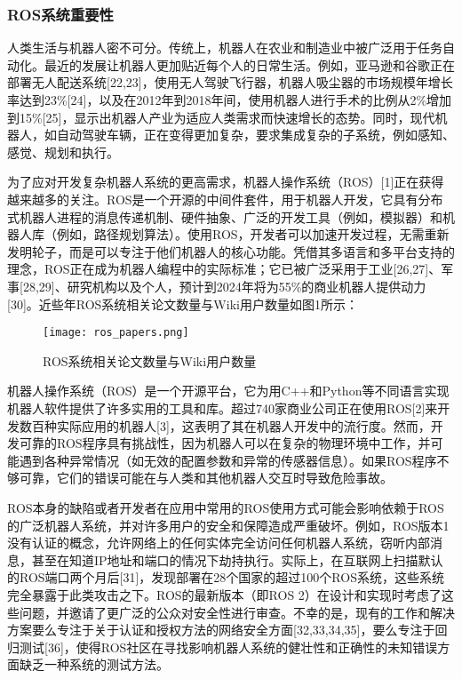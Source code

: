 \subsubsection{ROS系统重要性}
人类生活与机器人密不可分。传统上，机器人在农业和制造业中被广泛用于任务自动化。最近的发展让机器人更加贴近每个人的日常生活。例如，亚马逊和谷歌正在部署无人配送系统[22,23]，使用无人驾驶飞行器，机器人吸尘器的市场规模年增长率达到23\%[24]，以及在2012年到2018年间，使用机器人进行手术的比例从2\%增加到15\%[25]，显示出机器人产业为适应人类需求而快速增长的态势。同时，现代机器人，如自动驾驶车辆，正在变得更加复杂，要求集成复杂的子系统，例如感知、感觉、规划和执行。

为了应对开发复杂机器人系统的更高需求，机器人操作系统（ROS）[1]正在获得越来越多的关注。ROS是一个开源的中间件套件，用于机器人开发，它具有分布式机器人进程的消息传递机制、硬件抽象、广泛的开发工具（例如，模拟器）和机器人库（例如，路径规划算法）。使用ROS，开发者可以加速开发过程，无需重新发明轮子，而是可以专注于他们机器人的核心功能。凭借其多语言和多平台支持的理念，ROS正在成为机器人编程中的实际标准；它已被广泛采用于工业[26,27]、军事[28,29]、研究机构以及个人，预计到2024年将为55\%的商业机器人提供动力[30]。近些年ROS系统相关论文数量与Wiki用户数量如图1所示：

\begin{figure}[H]
  \centering
  \texttt{[image: ros\_papers.png]}
  \caption{ROS系统相关论文数量与Wiki用户数量}
\end{figure}

机器人操作系统（ROS）是一个开源平台，它为用C++和Python等不同语言实现机器人软件提供了许多实用的工具和库。超过740家商业公司正在使用ROS[2]来开发数百种实际应用的机器人[3]，这表明了其在机器人开发中的流行度。然而，开发可靠的ROS程序具有挑战性，因为机器人可以在复杂的物理环境中工作，并可能遇到各种异常情况（如无效的配置参数和异常的传感器信息）。如果ROS程序不够可靠，它们的错误可能在与人类和其他机器人交互时导致危险事故。

ROS本身的缺陷或者开发者在应用中常用的ROS使用方式可能会影响依赖于ROS的广泛机器人系统，并对许多用户的安全和保障造成严重破坏。例如，ROS版本1没有认证的概念，允许网络上的任何实体完全访问任何机器人系统，窃听内部消息，甚至在知道IP地址和端口的情况下劫持执行。实际上，在互联网上扫描默认的ROS端口两个月后[31]，发现部署在28个国家的超过100个ROS系统，这些系统完全暴露于此类攻击之下。ROS的最新版本（即ROS 2）在设计和实现时考虑了这些问题，并邀请了更广泛的公众对安全性进行审查。不幸的是，现有的工作和解决方案要么专注于关于认证和授权方法的网络安全方面[32,33,34,35]，要么专注于回归测试[36]，使得ROS社区在寻找影响机器人系统的健壮性和正确性的未知错误方面缺乏一种系统的测试方法。
